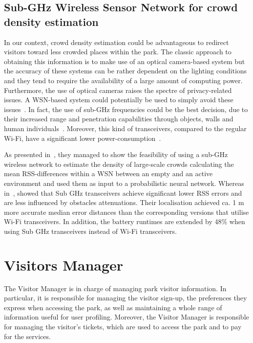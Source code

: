 \subsection{Sub-GHz Wireless Sensor Network for crowd density estimation}\label{subsec:sub-ghz-wireless-sensor-network-for-crowd-density-estimation}
In our context, crowd density estimation could be advantageous to redirect visitors toward less crowded places within the park.
The classic approach to obtaining this information is to make use of an optical camera-based system but the accuracy of these systems can be
rather dependent on the lighting conditions and they tend to require the availability of a large amount of computing power.
Furthermore, the use of optical cameras raises the spectre of privacy-related issues.
A WSN-based system could potentially be used to simply avoid these issues~\cite{denis2018large}.
In fact, the use of sub-GHz frequencies could be the best decision, due to their increased range and penetration capabilities through objects, walls and human individuals~\cite{denis2018large}.
Moreover, this kind of transceivers, compared to the regular Wi-Fi, have a significant lower power-consumption~\cite{fudickar2014comparing}.

As presented in~\cite{denis2018large}, they managed to show the feasibility of using a sub-GHz wireless network to estimate the
density of large-scale crowds calculating the mean RSS-differences within a WSN between an empty and an active environment and used them
as input to a probabilistic neural network.
Whereas in~\cite{fudickar2014comparing}, showed that Sub GHz transceivers achieve significant lower RSS errors and are less influenced by obstacles attenuations.
Their localisation achieved ca. 1 m more accurate median error distances than the corresponding versions that utilise Wi-Fi transceivers.
In addition, the battery runtimes are extended by 48\% when using Sub GHz transceivers instead of Wi-Fi transceivers.


\section{Visitors Manager}

The Visitor Manager is in charge of managing park visitor information. In particular, it is responsible for managing the visitor sign-up, the
preferences they express when accessing the park, as well as maintaining a whole range of information useful for user profiling.
Moreover, the Visitor Manager is responsible for managing the visitor's tickets, which are used to access the park and to pay for the services.


